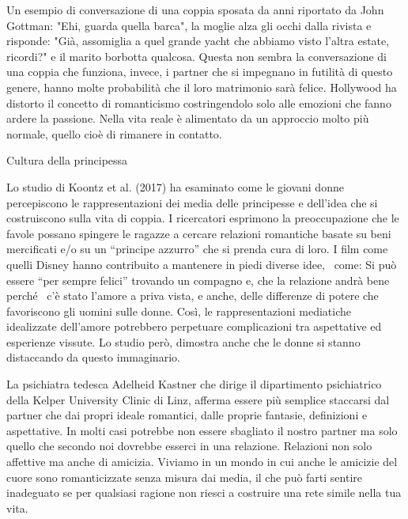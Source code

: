 \documentclass[12pt]{book} %
\begin{document}
\bigskip

Un esempio di conversazione di una coppia sposata da anni riportato da John Gottman: "Ehi, guarda
quella barca", la moglie alza gli occhi dalla rivista e risponde: "Già,
assomiglia a quel grande yacht che abbiamo visto l'altra estate, ricordi?" e
il marito borbotta qualcosa. Questa non sembra la conversazione di una coppia che funziona, invece, i partner che si
impegnano in futilità di questo genere, hanno molte probabilità che il loro matrimonio sarà felice.\newline
Hollywood ha distorto il concetto di romanticismo costringendolo solo alle emozioni che fanno ardere la passione. Nella
vita reale è alimentato da un approccio molto più normale, quello cioè di rimanere in contatto. 


\bigskip

\begin{mdframed}[linewidth=1pt]
Cultura della principessa

Lo studio di Koontz et al. (2017) ha esaminato
come le giovani donne percepiscono le rappresentazioni dei media delle principesse e dell'idea che
si costruiscono sulla vita di coppia. I ricercatori esprimono la preoccupazione che le favole possano spingere le
ragazze a cercare relazioni romantiche basate su beni mercificati e/o su un “principe azzurro” che si prenda cura di
loro. I film come quelli Disney hanno contribuito a mantenere in piedi diverse idee, \ come: Si può essere “per sempre
felici” trovando un compagno e, che la relazione andrà bene perché \ c'è stato
l'amore a priva vista, e anche, delle differenze di potere che favoriscono gli uomini sulle donne.
Così, le rappresentazioni mediatiche idealizzate dell'amore potrebbero perpetuare complicazioni
tra aspettative ed esperienze vissute. Lo studio però, dimostra anche che le donne si stanno distaccando da questo
immaginario.
\end{mdframed}

\bigskip

La psichiatra tedesca Adelheid Kastner che dirige il dipartimento psichiatrico della Kelper University Clinic di Linz,
afferma essere più semplice staccarsi dal partner che dai propri ideale romantici, dalle proprie fantasie, definizioni
e aspettative. In molti casi potrebbe non essere sbagliato il nostro partner ma solo quello che secondo noi dovrebbe
esserci in una relazione. Relazioni non solo affettive ma anche di amicizia. Viviamo in un mondo in cui anche le
amicizie del cuore sono romanticizzate senza misura dai media, il che può farti sentire inadeguato se per qualsiasi
ragione non riesci a costruire una rete simile nella tua vita. 
\end{document}

